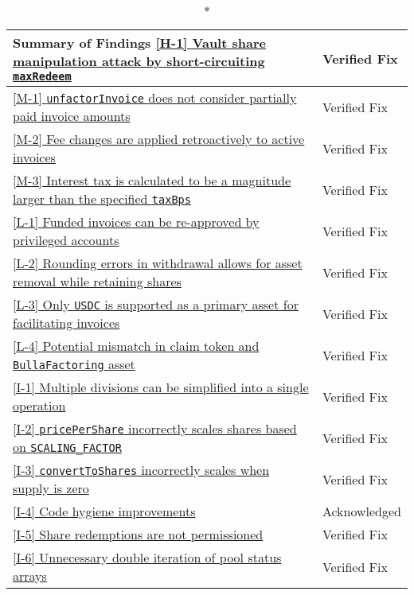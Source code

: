 \begin{longtable}{|p{12cm}|p{3cm}|}
  \caption*{\textbf{Summary of Findings}}
\hline\hyperlink{}{[H-1] Vault share manipulation attack by short-circuiting \texttt{maxRedeem}} & Verified Fix \\
\hline\hyperlink{}{[M-1] \texttt{unfactorInvoice} does not consider partially paid invoice amounts} & Verified Fix \\
\hline\hyperlink{}{[M-2] Fee changes are applied retroactively to active invoices} & Verified Fix \\
\hline\hyperlink{}{[M-3] Interest tax is calculated to be a magnitude larger than the specified \texttt{taxBps}} & Verified Fix \\
\hline\hyperlink{}{[L-1] Funded invoices can be re-approved by privileged accounts} & Verified Fix \\
\hline\hyperlink{}{[L-2] Rounding errors in withdrawal allows for asset removal while retaining shares} & Verified Fix \\
\hline\hyperlink{}{[L-3] Only \texttt{USDC} is supported as a primary asset for facilitating invoices} & Verified Fix \\
\hline\hyperlink{}{[L-4] Potential mismatch in claim token and \texttt{BullaFactoring} asset} & Verified Fix \\
\hline\hyperlink{}{[I-1] Multiple divisions can be simplified into a single operation} & Verified Fix \\
\hline\hyperlink{}{[I-2] \texttt{pricePerShare} incorrectly scales shares based on \texttt{SCALING\_FACTOR}} & Verified Fix \\
\hline\hyperlink{}{[I-3] \texttt{convertToShares} incorrectly scales when supply is zero} & Verified Fix \\
\hline\hyperlink{}{[I-4] Code hygiene improvements} & Acknowledged \\
\hline\hyperlink{}{[I-5] Share redemptions are not permissioned} & Verified Fix \\
\hline\hyperlink{}{[I-6] Unnecessary double iteration of pool status arrays} & Verified Fix \\
\hline
\end{longtable}
